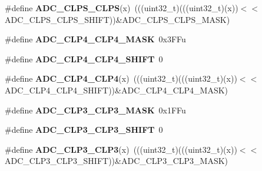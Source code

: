 \begin{DoxyCompactItemize}
\item 
\#define {\bfseries A\+D\+C\+\_\+\+C\+L\+P\+S\+\_\+\+C\+L\+PS}(x)~(((uint32\+\_\+t)(((uint32\+\_\+t)(x))$<$$<$A\+D\+C\+\_\+\+C\+L\+P\+S\+\_\+\+C\+L\+P\+S\+\_\+\+S\+H\+I\+FT))\&A\+D\+C\+\_\+\+C\+L\+P\+S\+\_\+\+C\+L\+P\+S\+\_\+\+M\+A\+SK)\hypertarget{group__ADC__Register__Masks_ga7b8e212b6c7c8504784c5af551e2b6bd}{}\label{group__ADC__Register__Masks_ga7b8e212b6c7c8504784c5af551e2b6bd}

\item 
\#define {\bfseries A\+D\+C\+\_\+\+C\+L\+P4\+\_\+\+C\+L\+P4\+\_\+\+M\+A\+SK}~0x3\+F\+Fu\hypertarget{group__ADC__Register__Masks_ga877d163ca4067627ebb29125d75eb757}{}\label{group__ADC__Register__Masks_ga877d163ca4067627ebb29125d75eb757}

\item 
\#define {\bfseries A\+D\+C\+\_\+\+C\+L\+P4\+\_\+\+C\+L\+P4\+\_\+\+S\+H\+I\+FT}~0\hypertarget{group__ADC__Register__Masks_gaee16600c1dd7fefead073d24320818a4}{}\label{group__ADC__Register__Masks_gaee16600c1dd7fefead073d24320818a4}

\item 
\#define {\bfseries A\+D\+C\+\_\+\+C\+L\+P4\+\_\+\+C\+L\+P4}(x)~(((uint32\+\_\+t)(((uint32\+\_\+t)(x))$<$$<$A\+D\+C\+\_\+\+C\+L\+P4\+\_\+\+C\+L\+P4\+\_\+\+S\+H\+I\+FT))\&A\+D\+C\+\_\+\+C\+L\+P4\+\_\+\+C\+L\+P4\+\_\+\+M\+A\+SK)\hypertarget{group__ADC__Register__Masks_gac1366655a895ce73fc06cd74002258a5}{}\label{group__ADC__Register__Masks_gac1366655a895ce73fc06cd74002258a5}

\item 
\#define {\bfseries A\+D\+C\+\_\+\+C\+L\+P3\+\_\+\+C\+L\+P3\+\_\+\+M\+A\+SK}~0x1\+F\+Fu\hypertarget{group__ADC__Register__Masks_gaeae73e0daf3e9a9174024850a719768d}{}\label{group__ADC__Register__Masks_gaeae73e0daf3e9a9174024850a719768d}

\item 
\#define {\bfseries A\+D\+C\+\_\+\+C\+L\+P3\+\_\+\+C\+L\+P3\+\_\+\+S\+H\+I\+FT}~0\hypertarget{group__ADC__Register__Masks_ga9eef257b72d4181481aa5e3bf0a85732}{}\label{group__ADC__Register__Masks_ga9eef257b72d4181481aa5e3bf0a85732}

\item 
\#define {\bfseries A\+D\+C\+\_\+\+C\+L\+P3\+\_\+\+C\+L\+P3}(x)~(((uint32\+\_\+t)(((uint32\+\_\+t)(x))$<$$<$A\+D\+C\+\_\+\+C\+L\+P3\+\_\+\+C\+L\+P3\+\_\+\+S\+H\+I\+FT))\&A\+D\+C\+\_\+\+C\+L\+P3\+\_\+\+C\+L\+P3\+\_\+\+M\+A\+SK)\hypertarget{group__ADC__Register__Masks_ga3f0884b7fa6046cdcb1cce1eb2511baf}{}\label{group__ADC__Register__Masks_ga3f0884b7fa6046cdcb1cce1eb2511baf}


\end{DoxyCompactItemize}
